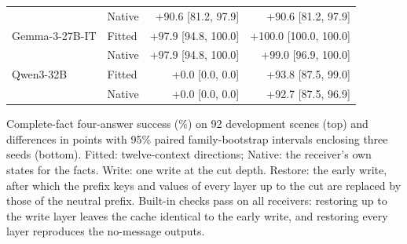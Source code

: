 \begin{table}[!htbp]
{\begin{tabular*}{\linewidth}{@{\extracolsep{\fill}}llrr@{}}
 & Native & +90.6 [81.2, 97.9] & +90.6 [81.2, 97.9] \\
\addlinespace[2pt]
Gemma-3-27B-IT & Fitted & +97.9 [94.8, 100.0] & +100.0 [100.0, 100.0] \\
 & Native & +97.9 [94.8, 100.0] & +99.0 [96.9, 100.0] \\
\addlinespace[2pt]
Qwen3-32B & Fitted & +0.0 [0.0, 0.0] & +93.8 [87.5, 99.0] \\
 & Native & +0.0 [0.0, 0.0] & +92.7 [87.5, 96.9] \\
\bottomrule
\end{tabular*}}
\par\vspace{3pt}
{\footnotesize\raggedright Complete-fact four-answer success (\%) on 92 development scenes (top) and differences in points with 95\% paired family-bootstrap intervals enclosing three seeds (bottom). Fitted: twelve-context directions; Native: the receiver's own states for the facts. Write: one write at the cut depth. Restore: the early write, after which the prefix keys and values of every layer up to the cut are replaced by those of the neutral prefix. Built-in checks pass on all receivers: restoring up to the write layer leaves the cache identical to the early write, and restoring every layer reproduces the no-message outputs.\par}
\end{table}
